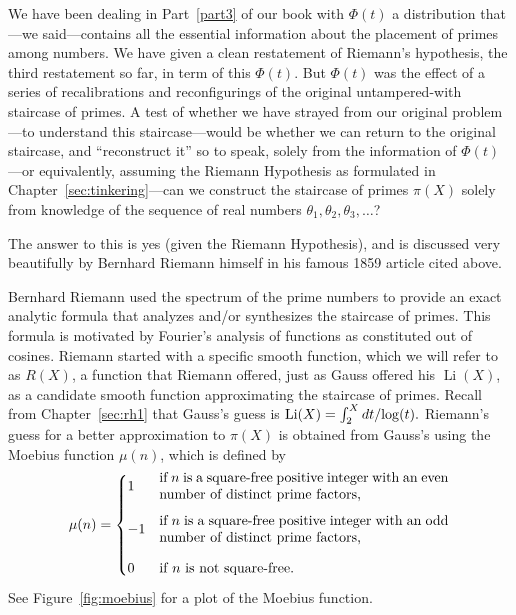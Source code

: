 \documentclass[openany]{book}
\DeclareMathOperator{\Li}{Li}
\theoremstyle{plain}
\theoremstyle{definition}
\newcommand{\RH}{Riemann Hypothesis\index{Riemann Hypothesis}}
\begin{document}
{{  We have been dealing in Part~\ref{part3} of our book with $\Phi(t)$ a
  distribution that---we said---contains all the essential information
  about the placement of primes among numbers. We have given a clean
  restatement of Riemann's hypothesis, the third restatement so far,
  in term of this $\Phi(t)$.  But $\Phi(t)$ was the effect of a series
  of recalibrations and reconfigurings of the original untampered-with
  staircase of primes.  A test of whether we have strayed from our
  original problem---to understand this staircase---would be whether
  we can return to the original staircase, and ``reconstruct it'' so to
  speak, solely from the information of $\Phi(t)$---or equivalently,
  assuming the \RH{} as formulated in Chapter~\ref{sec:tinkering}---can
  we construct the staircase of primes $\pi(X)$ solely
  from knowledge of the sequence of real numbers $\theta_1,
  \theta_2,\theta_3,\dots$?




  The answer to this is yes (given the \RH{}), and is discussed very
  beautifully by Bernhard Riemann himself in his famous 1859 article
  cited above.

  Bernhard Riemann used the spectrum of the prime numbers to provide
  an exact analytic formula that analyzes and/or synthesizes the
  staircase of primes.  This formula is motivated by Fourier's
  analysis of functions as constituted out of cosines.  Riemann started
  with a specific smooth function, which we will refer to as $R(X)$, a
  function that Riemann offered, just as Gauss offered his $\Li(X)$,
  as a candidate smooth function approximating the staircase of
  primes.  Recall from Chapter~\ref{sec:rh1} that Gauss's guess is
  $\Li(X)= \int_2^{X}dt/{\rm log}(t).$ Riemann's guess for a better
  approximation to $\pi(X)$ is obtained from Gauss's using the Moebius
  function $\mu(n)$, which is defined by
$$
 \mu(n) = \begin{cases}
    1 &
       \mbox{\begin{minipage}{0.6\textwidth}if $n$ is a square-free
       positive integer with an even number of distinct prime
       factors,\end{minipage}}\vspace{1em}\\
    -1& \mbox{\begin{minipage}{0.6\textwidth}if $n$ is a square-free
    positive integer with an odd number of distinct
    prime factors,\end{minipage}}\vspace{1em}\\
    0 & \mbox{if $n$ is not square-free.}
 \end{cases}
 $$
 See Figure~\ref{fig:moebius} for a plot of the Moebius function.

}}
\end{document}
